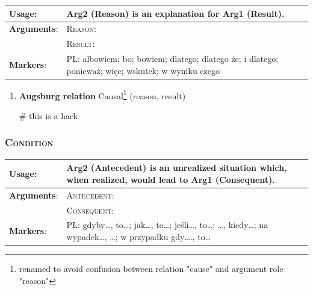 \documentclass{udisc}
\begin{document}


\label{cause}

\renewcommand{\arraystretch}{1.3}
\begin{tabularx}{\textwidth}{|l|L|}
\hline

\textbf{Usage}:           & Arg2 (Reason) is an explanation for Arg1 (Result). \\
\hline

\textbf{Arguments}:       &  \textsc{Reason}: \\
                          &  \textsc{Result}: \\
\hline

\textbf{Markers}:         &  PL: albowiem; bo; bowiem; dlatego; dlatego że; i dlatego; ponieważ; więc; wskutek; w wyniku czego \\
\hline

\end{tabularx}

\begin{enumerate}
\item \textbf{Augsburg relation} Causal\footnote{renamed to avoid confusion between relation "cause" and argument role "reason"} (reason, result)

\nonstopmode %
\nonstopmode # this is a hack
\end{enumerate}
\errorstopmode
\errorstopmode



\subsubsection{\textsc{Condition}}

\renewcommand{\arraystretch}{1.5}
\begin{tabularx}{\textwidth}{|l|L|}
\hline

\textbf{Usage}:           &  Arg2 (Antecedent) is an unrealized situation which, when realized, would lead to
Arg1 (Consequent). \\
\hline

\textbf{Arguments}:       &  \textsc{Antecedent}: \\
                          &  \textsc{Consequent}: \\
\hline

\textbf{Markers}:        &  PL: gdyby…, to…; jak…, to…; jeśli…, to…; …, kiedy…; na wypadek…, …; w przypadku gdy…., to… \\
\hline

\end{tabularx}
\end{document}
